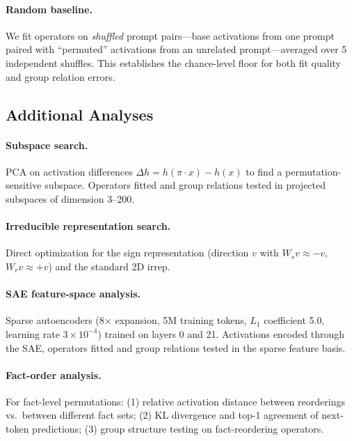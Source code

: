 \documentclass[10pt, letterpaper]{article}
\begin{document}
\paragraph{Random baseline.} We fit operators on \emph{shuffled} prompt pairs---base activations from one prompt paired with ``permuted'' activations from an unrelated prompt---averaged over 5 independent shuffles. This establishes the chance-level floor for both fit quality and group relation errors.

\subsection{Additional Analyses}

\paragraph{Subspace search.} PCA on activation differences $\Delta h = h(\pi \cdot x) - h(x)$ to find a permutation-sensitive subspace. Operators fitted and group relations tested in projected subspaces of dimension 3--200.

\paragraph{Irreducible representation search.} Direct optimization for the sign representation (direction $v$ with $W_s v \approx -v$, $W_r v \approx +v$) and the standard 2D irrep.

\paragraph{SAE feature-space analysis.} Sparse autoencoders \cite{bricken2023monosemanticity} (8$\times$ expansion, 5M training tokens, $L_1$ coefficient 5.0, learning rate $3 \times 10^{-4}$) trained on layers 0 and 21. Activations encoded through the SAE, operators fitted and group relations tested in the sparse feature basis.

\paragraph{Fact-order analysis.} For fact-level permutations: (1) relative activation distance between reorderings vs.\ between different fact sets; (2) KL divergence and top-1 agreement of next-token predictions; (3) group structure testing on fact-reordering operators.

\end{document}
